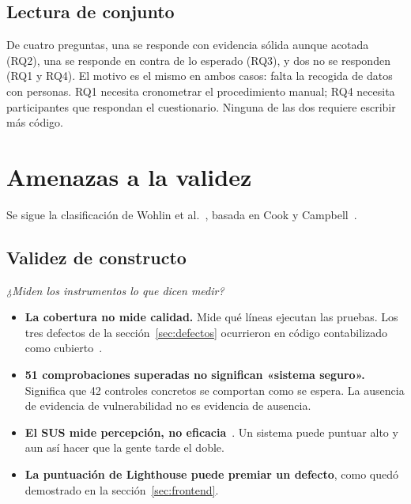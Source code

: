 \documentclass[11pt,a4paper]{article}
\begin{document}
\subsection{Lectura de conjunto}

De cuatro preguntas, una se responde con evidencia sólida aunque acotada (RQ2),
una se responde en contra de lo esperado (RQ3), y dos no se responden (RQ1 y
RQ4). El motivo es el mismo en ambos casos: falta la recogida de datos con
personas. RQ1 necesita cronometrar el procedimiento manual; RQ4 necesita
participantes que respondan el cuestionario. Ninguna de las dos requiere escribir
más código.

\section{Amenazas a la validez}\label{sec:validez}

Se sigue la clasificación de Wohlin et
al.~\cite{wohlin2012experimentation}, basada en Cook y
Campbell~\cite{cook1979quasi}.

\subsection{Validez de constructo}

\emph{¿Miden los instrumentos lo que dicen medir?}

\begin{itemize}[leftmargin=*]
  \item \textbf{La cobertura no mide calidad.} Mide qué líneas ejecutan las
        pruebas. Los tres defectos de la sección~\ref{sec:defectos} ocurrieron en
        código contabilizado como cubierto~\cite{inozemtseva2014coverage}.
  \item \textbf{51 comprobaciones superadas no significan «sistema seguro».}
        Significa que 42 controles concretos se comportan como se espera. La
        ausencia de evidencia de vulnerabilidad no es evidencia de ausencia.
  \item \textbf{El SUS mide percepción, no eficacia}~\cite{brooke1996sus}. Un
        sistema puede puntuar alto y aun así hacer que la gente tarde el doble.
  \item \textbf{La puntuación de Lighthouse puede premiar un defecto}, como quedó
        demostrado en la sección~\ref{sec:frontend}.
\end{itemize}
\end{document}

